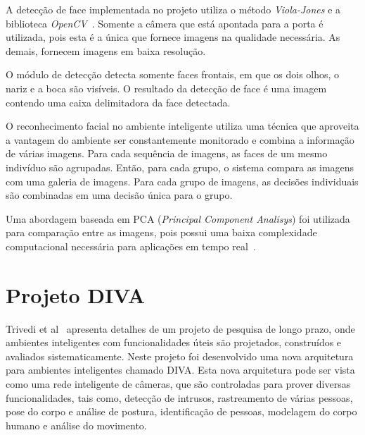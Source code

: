 A detecção de face implementada no projeto utiliza o método \textit{Viola-Jones} e a biblioteca \textit{OpenCV}~\cite{opencv_library}. Somente a câmera que está apontada para a porta é utilizada, pois esta é a única que fornece imagens na qualidade necessária. As demais, fornecem imagens em baixa resolução.  

O módulo de detecção detecta somente faces frontais, em que os dois olhos, o nariz e a boca são visíveis. O resultado da detecção de face é uma imagem contendo uma caixa delimitadora da face detectada.

O reconhecimento facial no ambiente inteligente utiliza uma técnica que aproveita a vantagem do ambiente ser constantemente monitorado e combina a informação de várias imagens. Para cada sequência de imagens, as faces de um mesmo indivíduo são agrupadas. Então, para cada grupo, o sistema compara as imagens com uma galeria de imagens. Para cada grupo de imagens, as decisões individuais são combinadas em uma decisão única para o grupo.

Uma abordagem baseada em PCA (\textit{Principal Component Analisys}) foi utilizada para comparação entre as imagens, pois possui uma baixa complexidade computacional necessária para aplicações em tempo real~\cite{salah}.


\section{Projeto DIVA}

Trivedi et al~\cite{trivedi} apresenta detalhes de um projeto de pesquisa de longo prazo, onde ambientes inteligentes com funcionalidades úteis são projetados, construídos e avaliados sistematicamente. Neste projeto foi desenvolvido uma nova arquitetura para ambientes inteligentes chamado DIVA. Esta nova arquitetura pode ser vista como uma rede inteligente de câmeras, que são controladas para prover diversas funcionalidades, tais como, detecção de intrusos, rastreamento de várias pessoas, pose do corpo e análise de postura, identificação de pessoas, modelagem do corpo humano e análise do movimento.

